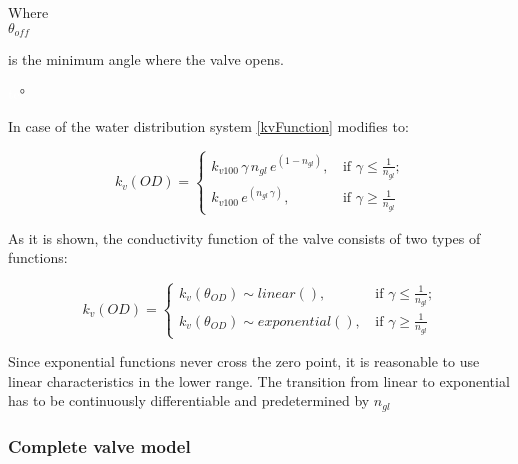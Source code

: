   \begin{minipage}[t]{0.20\textwidth}
Where\\
\hspace*{8mm} $\theta_{off}$ 
\end{minipage}
\begin{minipage}[t]{0.68\textwidth}
\vspace*{2mm}
is the minimum angle where the valve opens.

\end{minipage}
\begin{minipage}[t]{0.10\textwidth}
\vspace*{2mm}
\textcolor{White}{te}$\unit{\degree}$
\end{minipage}

In case of the water distribution system \eqref{kvFunction} modifies to: 

\begin{equation}
 k_v(OD) =
		\left\{
		\begin{array}{ll}
		
		k_{v100} \, \gamma \, n_{gl} \, e^{(1-n_{gl})} \text{,} & \mbox{ if } 	\gamma \leq \frac{1}					{n_{gl}} \text{;}
\\
		k_{v100} \, e^{(n_{gl} \,\gamma)} \text{,} & \mbox{ if } \gamma \geq \frac{1}{n_{gl}}

		\end{array}
		\right.
\end{equation}	

As it is shown, the conductivity function of the valve consists of two types of functions: 

\begin{equation}
 k_v(OD) =
		\left\{
		\begin{array}{ll}
		
		k_v(\theta_{OD}) \sim linear() \text{,} & \mbox{ if } 	\gamma \leq \frac{1}					{n_{gl}} \text{;}
\\
		k_v(\theta_{OD}) \sim exponential() \text{,} & \mbox{ if } \gamma \geq \frac{1}{n_{gl}}

		\end{array}
		\right.
\end{equation}	

Since exponential functions never cross the zero point, it is reasonable to use linear characteristics in the lower range. The transition from linear to exponential has to be continuously differentiable and predetermined by $n_{gl}$ \citep{Kallesoe2009,keller} 


\subsubsection{Complete valve model}
\label{unittransform}

